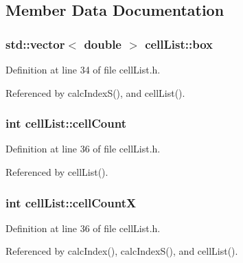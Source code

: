 \subsection{Member Data Documentation}
\hypertarget{classcell_list_ae65748b80d5e06edfa22daaf569f2757}{}
\subsubsection[{box}]{\setlength{\rightskip}{0pt plus 5cm}std\+::vector$<$ double $>$ cell\+List\+::box}\label{classcell_list_ae65748b80d5e06edfa22daaf569f2757}


Definition at line 34 of file cell\+List.\+h.



Referenced by calc\+Index\+S(), and cell\+List().

\hypertarget{classcell_list_a6a695015c180229cd491db58c6e18ff4}{}
\subsubsection[{cell\+Count}]{\setlength{\rightskip}{0pt plus 5cm}int cell\+List\+::cell\+Count}\label{classcell_list_a6a695015c180229cd491db58c6e18ff4}


Definition at line 36 of file cell\+List.\+h.



Referenced by cell\+List().

\hypertarget{classcell_list_a342f802c342f51f3c1aa4dab7d7a4d84}{}
\subsubsection[{cell\+Count\+X}]{\setlength{\rightskip}{0pt plus 5cm}int cell\+List\+::cell\+Count\+X}\label{classcell_list_a342f802c342f51f3c1aa4dab7d7a4d84}


Definition at line 36 of file cell\+List.\+h.



Referenced by calc\+Index(), calc\+Index\+S(), and cell\+List().

\hypertarget{classcell_list_a619d607f8569876cead1bdfad239d4b2}{}

